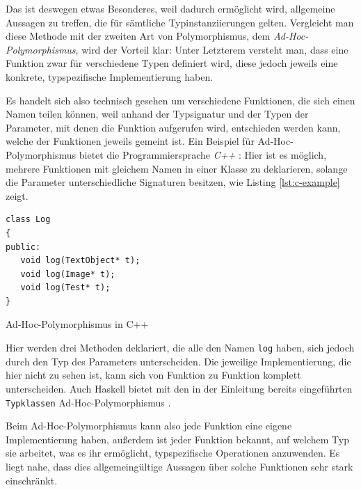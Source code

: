 Das ist deswegen etwas Besonderes, weil dadurch ermöglicht wird, allgemeine Aussagen zu treffen, die für sämtliche
Typinstanziierungen gelten. Vergleicht man diese Methode mit der zweiten Art von Polymorphismus, dem \textit{Ad-Hoc-Polymorphismus},
wird der Vorteil klar: Unter Letzterem versteht man, dass eine Funktion zwar für verschiedene Typen definiert wird, diese jedoch
jeweils eine konkrete, typspezifische Implementierung haben.

Es handelt sich also technisch gesehen um verschiedene Funktionen, die sich einen Namen teilen können, weil anhand der Typsignatur
und der Typen der Parameter, mit denen die Funktion aufgerufen wird, entschieden werden kann, welche der Funktionen jeweils gemeint ist.
Ein Beispiel für Ad-Hoc-Polymorphismus bietet die Programmiersprache \textit{C++} \cite{cpp}: Hier ist es möglich, mehrere Funktionen mit gleichem
Namen in einer Klasse zu deklarieren, solange die Parameter unterschiedliche Signaturen besitzen, wie Listing \ref{lst:c-example} zeigt.

\begin{listing}[ht]
\begin{verbatim}
class Log
{
public:
   void log(TextObject* t);
   void log(Image* t);
   void log(Test* t);
}
\end{verbatim}
\caption{Ad-Hoc-Polymorphismus in C++}
\label{lst:c-example}
\end{listing}

Hier werden drei Methoden deklariert, die alle den Namen \texttt{log} haben, sich jedoch durch den Typ des Parameters
unterscheiden. Die jeweilige Implementierung, die hier nicht zu sehen ist, kann sich von Funktion zu Funktion komplett unterscheiden.
Auch Haskell bietet mit den in der Einleitung bereits eingeführten \texttt{Typklassen} Ad-Hoc-Polymorphismus \cite{adhoc}.

Beim Ad-Hoc-Polymorphismus kann also jede Funktion eine eigene Implementierung haben, außerdem ist jeder Funktion
bekannt, auf welchem Typ sie arbeitet, was es ihr ermöglicht, typspezifische Operationen anzuwenden. Es liegt nahe, dass dies
allgemeingültige Aussagen über solche Funktionen sehr stark einschränkt.


